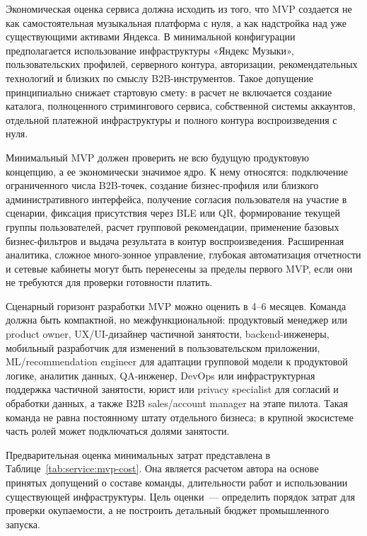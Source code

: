 Экономическая оценка сервиса должна исходить из того, что MVP создается не как самостоятельная музыкальная платформа с нуля, а как надстройка над уже существующими активами Яндекса. В минимальной конфигурации предполагается использование инфраструктуры «Яндекс Музыки», пользовательских профилей, серверного контура, авторизации, рекомендательных технологий и близких по смыслу B2B-инструментов. Такое допущение принципиально снижает стартовую смету: в расчет не включается создание каталога, полноценного стримингового сервиса, собственной системы аккаунтов, отдельной платежной инфраструктуры и полного контура воспроизведения с нуля.

Минимальный MVP должен проверить не всю будущую продуктовую концепцию, а ее экономически значимое ядро. К нему относятся: подключение ограниченного числа B2B-точек, создание бизнес-профиля или близкого административного интерфейса, получение согласия пользователя на участие в сценарии, фиксация присутствия через BLE или QR, формирование текущей группы пользователей, расчет групповой рекомендации, применение базовых бизнес-фильтров и выдача результата в контур воспроизведения. Расширенная аналитика, сложное много-зонное управление, глубокая автоматизация отчетности и сетевые кабинеты могут быть перенесены за пределы первого MVP, если они не требуются для проверки готовности платить.

Сценарный горизонт разработки MVP можно оценить в 4--6 месяцев. Команда должна быть компактной, но межфункциональной: продуктовый менеджер или product owner, UX/UI-дизайнер частичной занятости, backend-инженеры, мобильный разработчик для изменений в пользовательском приложении, ML/recommendation engineer для адаптации групповой модели к продуктовой логике, аналитик данных, QA-инженер, DevOps или инфраструктурная поддержка частичной занятости, юрист или privacy specialist для согласий и обработки данных, а также B2B sales/account manager на этапе пилота. Такая команда не равна постоянному штату отдельного бизнеса; в крупной экосистеме часть ролей может подключаться долями занятости.

Предварительная оценка минимальных затрат представлена в Таблице~\ref{tab:service:mvp-cost}. Она является расчетом автора на основе принятых допущений о составе команды, длительности работ и использовании существующей инфраструктуры. Цель оценки~--- определить порядок затрат для проверки окупаемости, а не построить детальный бюджет промышленного запуска.

